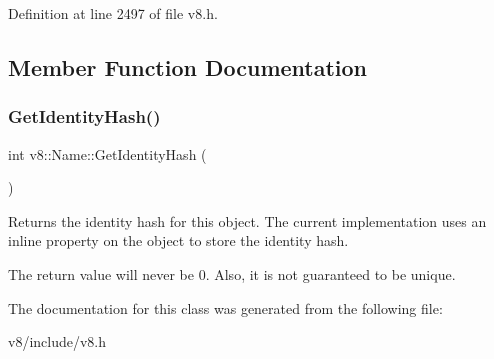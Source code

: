 Definition at line 2497 of file v8.\+h.



\subsection{Member Function Documentation}
\mbox{\label{classv8_1_1Name_aef60fce47685fad12914304f6bc52bf2}} 
\subsubsection{\texorpdfstring{Get\+Identity\+Hash()}{GetIdentityHash()}}
{\footnotesize\ttfamily int v8\+::\+Name\+::\+Get\+Identity\+Hash (\begin{DoxyParamCaption}{ }\end{DoxyParamCaption})}

Returns the identity hash for this object. The current implementation uses an inline property on the object to store the identity hash.

The return value will never be 0. Also, it is not guaranteed to be unique. 

The documentation for this class was generated from the following file\+:\begin{DoxyCompactItemize}
\item 
v8/include/v8.\+h\end{DoxyCompactItemize}
